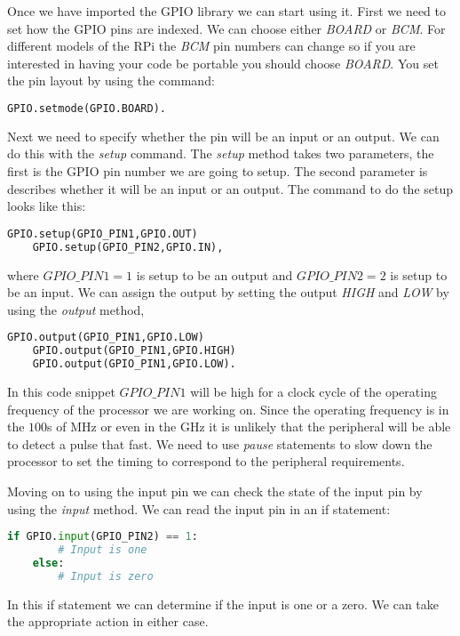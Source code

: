 Once we have imported the \ac{GPIO} library we can start using it. First we need to set how the \ac{GPIO} pins are indexed. We can choose either \emph{BOARD} or \emph{BCM}. For different models of the \ac{RPi} the \emph{BCM} pin numbers can change so if you are interested in having your code be portable you should choose \emph{BOARD}. You set the pin layout by using the command:

\begin{lstlisting}[language=python]
    GPIO.setmode(GPIO.BOARD).
\end{lstlisting}

Next we need to specify whether the pin will be an input or an output. We can do this with the \emph{setup} command. The \emph{setup} method takes two parameters, the first is the \ac{GPIO} pin number we are going to setup. The second parameter is describes whether it will be an input or an output. The command to do the setup looks like this:

\begin{lstlisting}[language=python]
    GPIO.setup(GPIO_PIN1,GPIO.OUT)
    GPIO.setup(GPIO_PIN2,GPIO.IN),
\end{lstlisting}

where $GPIO\_PIN1=1$ is setup to be an output and $GPIO\_PIN2=2$ is setup to be an input. We can assign the output by setting the output \emph{HIGH} and \emph{LOW} by using the \emph{output} method,

\begin{lstlisting}[language=python]
    GPIO.output(GPIO_PIN1,GPIO.LOW)
    GPIO.output(GPIO_PIN1,GPIO.HIGH)
    GPIO.output(GPIO_PIN1,GPIO.LOW).
\end{lstlisting}

In this code snippet $GPIO\_PIN1$ will be high for a clock cycle of the operating frequency of the processor we are working on. Since the operating frequency is in the $100$s of \ac{MHz} or even in the \ac{GHz} it is unlikely that the peripheral will be able to detect a pulse that fast. We need to use \emph{pause} statements to slow down the processor to set the timing to correspond to the peripheral requirements. 

Moving on to using the input pin we can check the state of the input pin by using the \emph{input} method. We can read the input pin in an if statement:

\begin{lstlisting}[language=python]
    if GPIO.input(GPIO_PIN2) == 1:
        # Input is one
    else:
        # Input is zero
\end{lstlisting}

In this if statement we can determine if the input is one or a zero. We can take the appropriate action in either case. 

